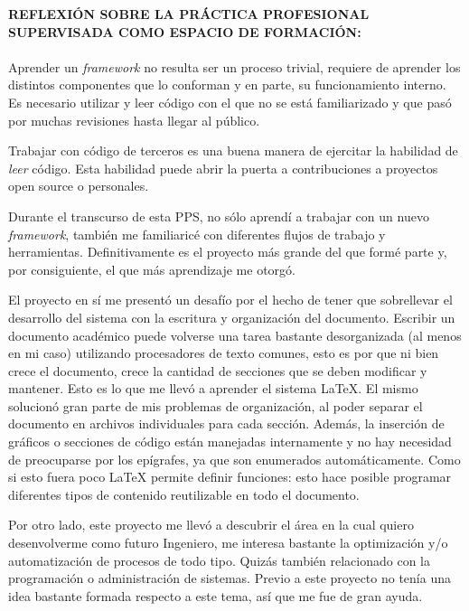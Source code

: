\begin{framed}

        \noindent\textbf{REFLEXIÓN SOBRE LA PRÁCTICA PROFESIONAL SUPERVISADA COMO ESPACIO DE FORMACIÓN:}\\~\\


        Aprender un \textit{framework} no resulta ser un proceso trivial, requiere de aprender los
        distintos componentes que lo conforman y en parte, su funcionamiento interno\@. Es necesario
        utilizar y leer código con el que no se está familiarizado y que pasó por muchas revisiones
        hasta llegar al público.

        Trabajar con código de terceros es una buena manera de ejercitar la habilidad de \textit{leer}
        código\@. Esta habilidad puede abrir la puerta a contribuciones a proyectos open source o
        personales.

        Durante el transcurso de esta PPS, no sólo aprendí a trabajar con un nuevo \textit{framework},
        también me familiaricé con diferentes flujos de trabajo y herramientas\@. Definitivamente es
        el proyecto más grande del que formé parte y, por consiguiente, el que más aprendizaje me otorgó.

        El proyecto en sí me presentó un desafío por el hecho de tener que sobrellevar el desarrollo
        del sistema con la escritura y organización del documento\@. Escribir un documento académico
        puede volverse una tarea bastante desorganizada (al menos en mi caso) utilizando procesadores
        de texto comunes, esto es por que ni bien crece el documento, crece la cantidad de secciones
        que se deben modificar y mantener\@. Esto es lo que me llevó a aprender el sistema {\LaTeX}\@.
        El mismo solucionó gran parte de mis problemas de organización, al poder
        separar el documento en archivos individuales para cada sección\@. Además, la inserción de
        gráficos o secciones de código están manejadas internamente y no hay necesidad de
        preocuparse por los
        epígrafes, ya que son enumerados automáticamente\@. Como si esto fuera poco {\LaTeX} permite
        definir funciones: esto hace posible programar diferentes tipos de contenido reutilizable en todo el
        documento.


        Por otro lado, este proyecto me llevó a descubrir el área en la cual quiero desenvolverme como
        futuro Ingeniero, me interesa bastante la optimización y/o automatización de procesos de todo
        tipo. Quizás también relacionado con la programación o administración de sistemas\@. Previo a
        este proyecto no tenía una idea bastante formada respecto a este tema, así que me fue de gran
        ayuda.

\end{framed}
